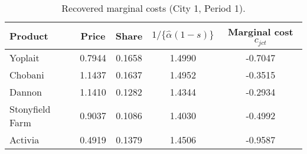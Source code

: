 \begin{table}[H]
\centering
\caption{Recovered marginal costs (City 1, Period 1).}
\label{tab:q7_mc_c1t1}
\begin{tabular}{lcccc}
\toprule
Product & Price & Share & $1/\{\hat\alpha(1-s)\}$ & Marginal cost $c_{jct}$ \\
\midrule
Yoplait & 0.7944 & 0.1658 & 1.4990 & -0.7047 \\
Chobani & 1.1437 & 0.1637 & 1.4952 & -0.3515 \\
Dannon & 1.1410 & 0.1282 & 1.4344 & -0.2934 \\
Stonyfield Farm & 0.9037 & 0.1086 & 1.4030 & -0.4992 \\
Activia & 0.4919 & 0.1379 & 1.4506 & -0.9587 \\
\bottomrule
\end{tabular}
\end{table}
